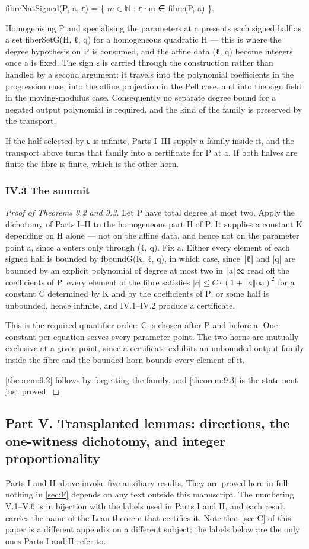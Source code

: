 fibreNatSigned(P, a, ε) = \{ $m ∈ ℕ$ : ε·m ∈ fibre(P, a) \}.

Homogenising P and specialising the parameters at a presents each signed half as a set fiberSetG(H, ℓ, q) for a homogeneous quadratic H — this is where the degree hypothesis on P is consumed, and the affine data (ℓ, q) become integers once a is fixed. The sign ε is carried through the construction rather than handled by a second argument: it travels into the polynomial coefficients in the progression case, into the affine projection in the Pell case, and into the sign field in the moving-modulus case. Consequently no separate degree bound for a negated output polynomial is required, and the kind of the family is preserved by the transport.

If the half selected by ε is infinite, Parts I–III supply a family inside it, and the transport above turns that family into a certificate for P at a. If both halves are finite the fibre is finite, which is the other horn.

\subsubsection*{IV.3 The summit}
\begin{proof}[Proof of Theorems 9.2 and 9.3]
Let P have total degree at most two. Apply the dichotomy of Parts I–II to the homogeneous part H of P. It supplies a constant K depending on H alone — not on the affine data, and hence not on the parameter point a, since a enters only through (ℓ, q). Fix a. Either every element of each signed half is bounded by fboundG(K, ℓ, q), in which case, since ‖ℓ‖ and |q| are bounded by an explicit polynomial of degree at most two in ‖a‖∞ read off the coefficients of P, every element of the fibre satisfies $|c| ≤ C·(1 + ‖a‖∞)^{2}$ for a constant C determined by K and by the coefficients of P; or some half is unbounded, hence infinite, and IV.1–IV.2 produce a certificate.

This is the required quantifier order: C is chosen after P and before a. One constant per equation serves every parameter point. The two horns are mutually exclusive at a given point, since a certificate exhibits an unbounded output family inside the fibre and the bounded horn bounds every element of it.

\cref{theorem:9.2} follows by forgetting the family, and \cref{theorem:9.3} is the statement just proved.

\end{proof}
\subsection*{Part V. Transplanted lemmas: directions, the one-witness dichotomy, and integer proportionality}
Parts I and II above invoke five auxiliary results. They are proved here in full: nothing in \cref{sec:F} depends on any text outside this manuscript. The numbering V.1–V.6 is in bijection with the labels used in Parts I and II, and each result carries the name of the Lean theorem that certifies it. Note that \cref{sec:C} of this paper is a different appendix on a different subject; the labels below are the only ones Parts I and II refer to.

